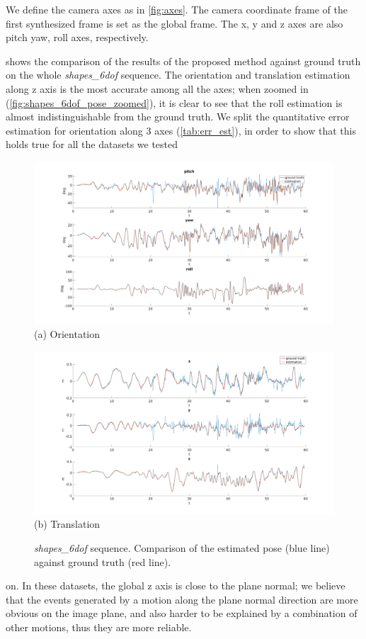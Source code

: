 We define the camera axes as in \cref{fig:axes}. The camera coordinate
frame of the first synthesized frame is set as the global frame. The
x, y and z axes are also pitch yaw, roll axes, respectively.

 shows the comparison of the results of the
proposed method against ground truth on the whole
\textit{shapes\_6dof} sequence. The orientation and translation
estimation along z axis is the most accurate among all the axes; when
zoomed in (\cref{fig:shapes_6dof_pose_zoomed}), it is clear to see
that the roll estimation is almost indistinguishable from the ground
truth. We split the quantitative error estimation for orientation
along 3 axes (\cref{tab:err_est}), in order to show that this holds
true for all the datasets we tested
\begin{figure}[H]
  \begin{minipage}[t]{\textwidth}
    \centering \includegraphics[trim={5cm 0cm 5cm 0cm},clip,width =
    \textwidth]{images/shapes_6dof_rotation.png} (a) Orientation
  \end{minipage}
  \hfill
  \begin{minipage}[t]{\textwidth}
    \centering \includegraphics[trim={5cm 0cm 5cm 0cm},clip,width =
    \textwidth]{images/shapes_6dof_translation.png} (b) Translation
  \end{minipage}
  \hfill
  \caption{\textit{shapes\_6dof} sequence. Comparison of the estimated
    pose (blue line) against ground truth (red line).}
  \label{fig:shapes_6dof_pose}
\end{figure}
on. In these datasets, the global z axis is close to the plane normal;
we believe that the events generated by a motion along the plane
normal direction are more obvious on the image plane, and also harder
to be explained by a combination of other motions, thus they are more
reliable.

